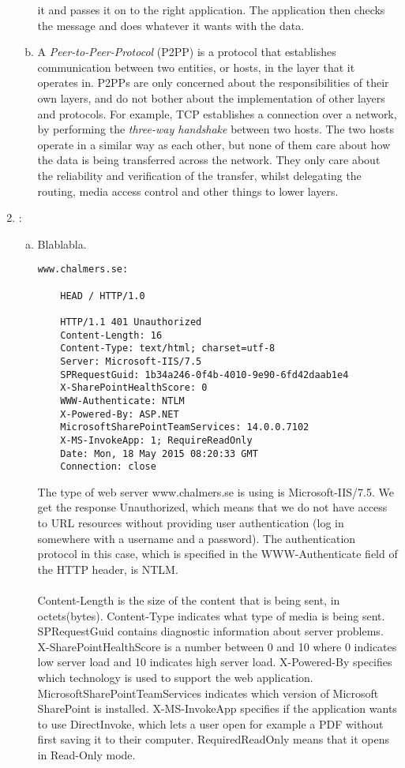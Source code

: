 \documentclass[a4paper,9pt,fleqn]{article}
\begin{document}
\begin{enumerate}[{Task} 1]
\begin{enumerate}[a)]
		it and passes it on to the right application. The application then checks
		the message and does whatever it wants with the data.
		\\
		\item 
		A {\it Peer-to-Peer-Protocol} (P2PP) is a protocol that establishes communication
		between two entities, or hosts, in the layer that it operates in. P2PPs are
		only concerned about the responsibilities of their own layers, and do not bother
		about the implementation of other layers and protocols. For example, TCP
		establishes a connection over a network, by performing the {\it three-way handshake}
		between two hosts. The two hosts operate in a similar way as each other, but none
		of them care about how the data is being transferred across the network. They only
		care about the reliability and verification of the transfer, whilst delegating
		the routing, media access control and other things to lower layers.
	\end{enumerate}

\item :
	\begin{enumerate}[a)]
		\item
		Blablabla.

\begin{lstlisting}
www.chalmers.se:

	HEAD / HTTP/1.0

	HTTP/1.1 401 Unauthorized
	Content-Length: 16
	Content-Type: text/html; charset=utf-8
	Server: Microsoft-IIS/7.5
	SPRequestGuid: 1b34a246-0f4b-4010-9e90-6fd42daab1e4
	X-SharePointHealthScore: 0
	WWW-Authenticate: NTLM
	X-Powered-By: ASP.NET
	MicrosoftSharePointTeamServices: 14.0.0.7102
	X-MS-InvokeApp: 1; RequireReadOnly
	Date: Mon, 18 May 2015 08:20:33 GMT
	Connection: close
\end{lstlisting}	

		The type of web server {\outp www.chalmers.se} is using is {\outp Microsoft-IIS/7.5}.
		We get the response { Unauthorized}, which means that we do not have access
		to URL resources without providing user authentication (log in somewhere with
		a username and a password). The authentication protocol in this case, which
		is specified in the {\outp WWW-Authenticate} field of the HTTP header, is {\outp NTLM}.
		\\ \\
		Content-Length is the size of the content that is being sent, in octets(bytes).
		Content-Type indicates what type of media is being sent.
		SPRequestGuid contains diagnostic information about server problems.
		X-SharePointHealthScore is a number between 0 and 10 where 0 indicates low server load and 10 indicates high server load.
		X-Powered-By specifies which technology is used to support the web application.
		MicrosoftSharePointTeamServices indicates which version of Microsoft SharePoint is installed.
		X-MS-InvokeApp specifies if the application wants to use DirectInvoke, which lets a user open for example a PDF without first saving it to their computer. 
		RequiredReadOnly means that it opens in Read-Only mode.


\end{enumerate}
\end{enumerate}
\end{document}
